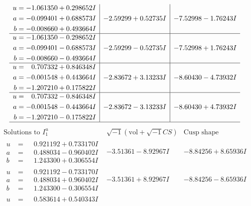 \documentclass[1p]{elsarticle_modified}
\theoremstyle{definition}
\newcommand{\I}{\sqrt{-1}}
\begin{document}
$$\begin{array}{c|c|c}
\begin{aligned}
u &= -1.061350 + 0.298652 I \\
a &= -0.099401 + 0.688573 I \\
b &= -0.008660 + 0.493664 I\end{aligned}
 & -2.59299 + 0.52735 I & -7.52998 - 1.76243 I \\ \hline\begin{aligned}
u &= -1.061350 - 0.298652 I \\
a &= -0.099401 - 0.688573 I \\
b &= -0.008660 - 0.493664 I\end{aligned}
 & -2.59299 - 0.52735 I & -7.52998 + 1.76243 I \\ \hline\begin{aligned}
u &= \phantom{-}0.707332 + 0.846348 I \\
a &= -0.001548 + 0.443664 I \\
b &= -1.207210 + 0.175822 I\end{aligned}
 & -2.83672 + 3.13233 I & -8.60430 - 4.73932 I \\ \hline\begin{aligned}
u &= \phantom{-}0.707332 - 0.846348 I \\
a &= -0.001548 - 0.443664 I \\
b &= -1.207210 - 0.175822 I\end{aligned}
 & -2.83672 - 3.13233 I & -8.60430 + 4.73932 I\\
 \hline 
 \end{array}$$\newpage$$\begin{array}{c|c|c}  
\text{Solutions to }I^u_{1}& \I (\text{vol} + \sqrt{-1}CS) & \text{Cusp shape}\\
 \hline 
\begin{aligned}
u &= \phantom{-}0.921192 + 0.733170 I \\
a &= \phantom{-}0.488034 - 0.960402 I \\
b &= \phantom{-}1.243300 + 0.306554 I\end{aligned}
 & -3.51361 - 8.92967 I & -8.84256 + 8.65936 I \\ \hline\begin{aligned}
u &= \phantom{-}0.921192 - 0.733170 I \\
a &= \phantom{-}0.488034 + 0.960402 I \\
b &= \phantom{-}1.243300 - 0.306554 I\end{aligned}
 & -3.51361 + 8.92967 I & -8.84256 - 8.65936 I \\ \hline\begin{aligned}
u &= \phantom{-}0.583614 + 0.540343 I \\

\end{aligned}
\end{array}$$
\end{document}
